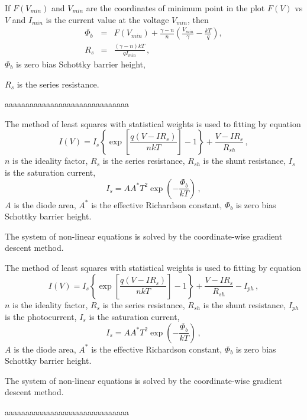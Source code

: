 \documentclass[14pt]{article}
\numberwithin{equation}{part}
\begin{document}
If $F(V_{min})$ and $V_{min}$ are the coordinates of minimum point in the plot $F(V)$ vs $V$ and
$I_{min}$ is the current value at the voltage $V_{min}$, then
\begin{eqnarray*}
\Phi_b&=&F(V_{min})+\frac{\gamma-n}{n}\left(\frac{V_{min}}{\gamma}-\frac{kT}{q}\right),
\\
R_s&=&\frac{(\gamma-n)kT}{qI_{min}}\,,
\end{eqnarray*}
$\Phi_b$ is zero bias Schottky barrier height,

\noindent
$R_s$ is the series resistance.


\vspace{5mm}
aaaaaaaaaaaaaaaaaaaaaaaaaaaaaa
\vspace{5mm}

The method of least squares with statistical weights is used to fitting by equation 
\begin{equation*}
I(V)=I_s\left\{\exp \left[\frac{q(V-IR_s)}{nkT}\right]-1\right\}+\frac{V-IR_s}{R_{sh}}\,,
\end{equation*}
$n$ is the ideality factor,
$R_s$ is the series resistance,
$R_{sh}$ is the shunt resistance,
$I_s$ is the saturation current,
\begin{equation*}
I_s=AA^*T^2\exp\left(-\frac{\Phi_b}{kT}\right)\,,
\end{equation*}
$A$ is the diode area,
$A^*$ is the effective Richardson constant,
$\Phi_b$ is zero bias Schottky barrier height.

The system of non-linear equations is solved by the coordinate-wise gradient descent method.


\pagebreak

The method of least squares with statistical weights is used to fitting by equation
\begin{equation*}
I(V)=I_s\left\{\exp \left[\frac{q(V-IR_s)}{nkT}\right]-1\right\}+\frac{V-IR_s}{R_{sh}}-I_{ph}\,,
\end{equation*}
$n$ is the ideality factor,
$R_s$ is the series resistance,
$R_{sh}$ is the shunt resistance,
$I_{ph}$ is the photocurrent,
$I_s$ is the saturation current,
\begin{equation*}
I_s=AA^*T^2\exp\left(-\frac{\Phi_b}{kT}\right)\,,
\end{equation*}
$A$ is the diode area,
$A^*$ is the effective Richardson constant,
$\Phi_b$ is zero bias Schottky barrier height.

The system of non-linear equations is solved by the coordinate-wise gradient descent method.

\vspace{5mm}
aaaaaaaaaaaaaaaaaaaaaaaaaaaaaa
\vspace{5mm}
\end{document}
